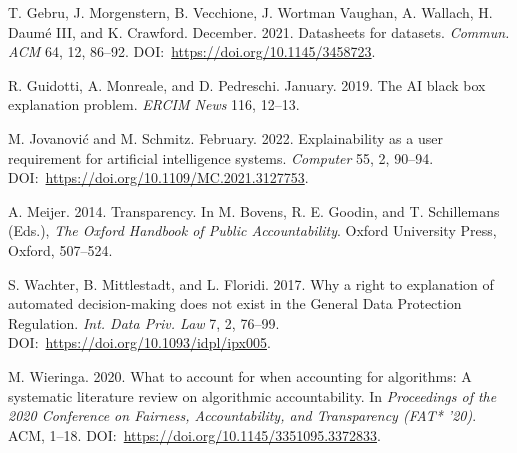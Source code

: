 \begin{thebibliography}{00}
 T. Gebru, J. Morgenstern, B. Vecchione, J. Wortman Vaughan, A. Wallach, H. Daum\'{e} III, and K. Crawford. December. 2021. Datasheets for datasets. \textit{Commun. ACM }64, 12, 86--92. DOI:~\href{https://doi.org/10.1145/3458723}{https://{\allowbreak}doi.{\allowbreak}org/{\allowbreak}10.{\allowbreak}1145/{\allowbreak}3458723}.

 R. Guidotti, A. Monreale, and D. Pedreschi. January. 2019. The AI black box explanation problem. \textit{ERCIM News }116, 12--13.

 M. Jovanovi\'c and M. Schmitz. February. 2022. Explainability as a user requirement for artificial intelligence systems. \textit{Computer} 55, 2, 90--94. DOI:~\href{https://doi.org/10.1109/MC.2021.3127753}{https://{\allowbreak}doi.{\allowbreak}org/{\allowbreak}10.{\allowbreak}1109/{\allowbreak}MC.{\allowbreak}2021.{\allowbreak}3127753}.

 A. Meijer. 2014. Transparency. In M. Bovens, R. E. Goodin, and T. Schillemans (Eds.), \textit{The Oxford Handbook of Public Accountability}. Oxford University Press, Oxford, 507--524.

 S. Wachter, B. Mittlestadt, and L. Floridi. 2017. Why a right to explanation of automated decision-making does not exist in the General Data Protection Regulation. \textit{Int. Data Priv. Law} 7, 2, 76--99. DOI:~\href{https://doi.org/10.1093/idpl/ipx005}{https://{\allowbreak}doi.{\allowbreak}org/{\allowbreak}10.{\allowbreak}1093/{\allowbreak}idpl/{\allowbreak}ipx005}.


 M. Wieringa. 2020. What to account for when accounting for algorithms: A systematic literature review on algorithmic accountability. In \textit{Proceedings of the 2020 Conference on Fairness, Accountability, and Transparency (FAT* '20)}. ACM, 1--18. DOI:~\href{https://doi.org/10.1145/3351095.3372833}{https://{\allowbreak}doi.{\allowbreak}org/{\allowbreak}10.{\allowbreak}1145/{\allowbreak}3351095.{\allowbreak}3372833}.
\end{thebibliography}

%

